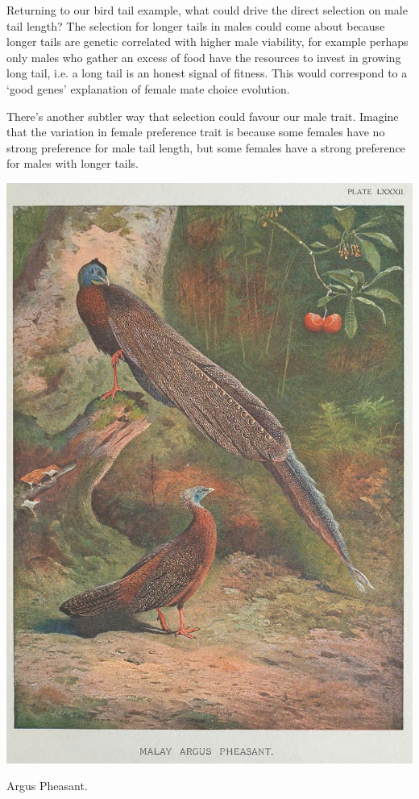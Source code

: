 Returning to our bird tail example, what could drive the direct
selection on male tail length? The selection for longer tails in males could come about because
longer tails are genetic correlated with higher male viability, for
example perhaps only males who gather an excess of food have the
resources to invest in growing long tail, i.e. a long tail is an
honest signal of fitness. This would correspond to a `good genes' explanation of female mate
choice evolution.  


There's another subtler way that selection could favour our male
trait. Imagine that the variation in female preference trait is
because some females have no strong preference for male tail
length, but some females have a strong preference for males with
longer tails.
\begin{marginfigure}
\begin{center}
\includegraphics[width= \textwidth]{illustration_images/Quant_gen/Argus_pheasant/Argus_pheasant_small.jpg}
\end{center}
\caption{Argus Pheasant.  } \label{fig:argus}
\end{marginfigure}
